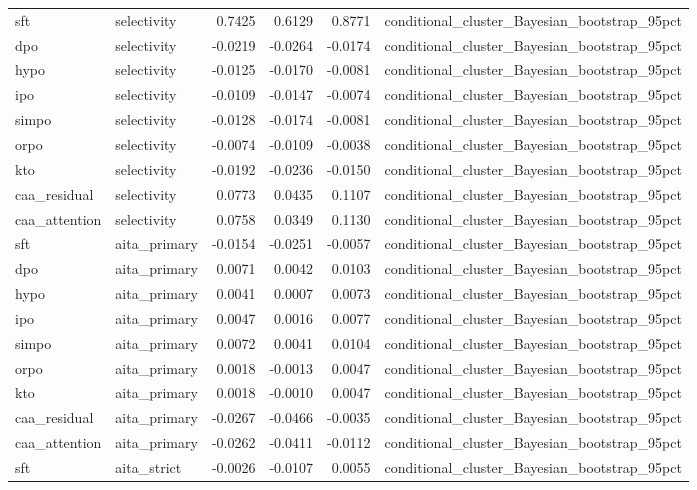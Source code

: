 \begin{tabular}{llrrrl}
sft & selectivity & 0.7425 & 0.6129 & 0.8771 & conditional\_cluster\_Bayesian\_bootstrap\_95pct \\
dpo & selectivity & -0.0219 & -0.0264 & -0.0174 & conditional\_cluster\_Bayesian\_bootstrap\_95pct \\
hypo & selectivity & -0.0125 & -0.0170 & -0.0081 & conditional\_cluster\_Bayesian\_bootstrap\_95pct \\
ipo & selectivity & -0.0109 & -0.0147 & -0.0074 & conditional\_cluster\_Bayesian\_bootstrap\_95pct \\
simpo & selectivity & -0.0128 & -0.0174 & -0.0081 & conditional\_cluster\_Bayesian\_bootstrap\_95pct \\
orpo & selectivity & -0.0074 & -0.0109 & -0.0038 & conditional\_cluster\_Bayesian\_bootstrap\_95pct \\
kto & selectivity & -0.0192 & -0.0236 & -0.0150 & conditional\_cluster\_Bayesian\_bootstrap\_95pct \\
caa\_residual & selectivity & 0.0773 & 0.0435 & 0.1107 & conditional\_cluster\_Bayesian\_bootstrap\_95pct \\
caa\_attention & selectivity & 0.0758 & 0.0349 & 0.1130 & conditional\_cluster\_Bayesian\_bootstrap\_95pct \\
sft & aita\_primary & -0.0154 & -0.0251 & -0.0057 & conditional\_cluster\_Bayesian\_bootstrap\_95pct \\
dpo & aita\_primary & 0.0071 & 0.0042 & 0.0103 & conditional\_cluster\_Bayesian\_bootstrap\_95pct \\
hypo & aita\_primary & 0.0041 & 0.0007 & 0.0073 & conditional\_cluster\_Bayesian\_bootstrap\_95pct \\
ipo & aita\_primary & 0.0047 & 0.0016 & 0.0077 & conditional\_cluster\_Bayesian\_bootstrap\_95pct \\
simpo & aita\_primary & 0.0072 & 0.0041 & 0.0104 & conditional\_cluster\_Bayesian\_bootstrap\_95pct \\
orpo & aita\_primary & 0.0018 & -0.0013 & 0.0047 & conditional\_cluster\_Bayesian\_bootstrap\_95pct \\
kto & aita\_primary & 0.0018 & -0.0010 & 0.0047 & conditional\_cluster\_Bayesian\_bootstrap\_95pct \\
caa\_residual & aita\_primary & -0.0267 & -0.0466 & -0.0035 & conditional\_cluster\_Bayesian\_bootstrap\_95pct \\
caa\_attention & aita\_primary & -0.0262 & -0.0411 & -0.0112 & conditional\_cluster\_Bayesian\_bootstrap\_95pct \\
sft & aita\_strict & -0.0026 & -0.0107 & 0.0055 & conditional\_cluster\_Bayesian\_bootstrap\_95pct \\

\end{tabular}
